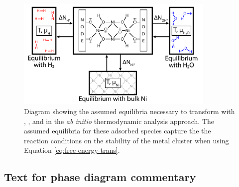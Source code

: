 \documentclass[12pt]{article}
\begin{document}
\begin{figure}[H]
    \centering
    \includegraphics[width=0.85\textwidth]{zi-images/00-General-Graphics/FPT-schematic-full.png}
    \caption{Diagram showing the assumed equilibria necessary to transform with , , and  in the \textit{ab initio} thermodynamic analysis approach. The assumed equilibria for these adsorbed species capture the the reaction conditions on the stability of the metal cluster when using Equation \ref{eq:free-energy-trans}.}
    \label{fig:FPT-process}
\end{figure}


\subsection{Text for phase diagram commentary}

\end{document}
